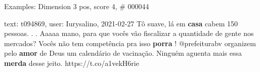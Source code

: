 \begin{frame}{Examples: Dimension 3 pos, score 4, \# 000044}
\footnotesize
\begin{exampleblock}{text: t094869, user: Iurysalino, 2021-02-27}
Tô suave, lá em \textbf{casa} cabem 150 pessoas. . . Aaaaa mano, para que vocês 
vão fiscalizar a quantidade de gente nos mercados? Vocês não tem competência 
pra isso \textbf{porra} ! @prefeiturabv organizem pelo \textbf{amor} de Deus um 
calendário de vacinação. Ninguém aguenta mais essa \textbf{merda} desse jeito. 
https://t.co/a1vekH6rie 
\end{exampleblock}
\end{frame}
